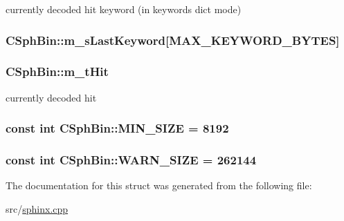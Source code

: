 currently decoded hit keyword (in keywords dict mode) 

\hypertarget{structCSphBin_ab3d45d1754daa2e7175ece1785856551}{
\subsubsection[{m\-\_\-s\-Last\-Keyword}]{ C\-Sph\-Bin\-::m\-\_\-s\-Last\-Keyword\mbox{[}{\bf M\-A\-X\-\_\-\-K\-E\-Y\-W\-O\-R\-D\-\_\-\-B\-Y\-T\-E\-S}\mbox{]}\hspace{0.3cm}{\ttfamily [protected]}}}\label{structCSphBin_ab3d45d1754daa2e7175ece1785856551}
\hypertarget{structCSphBin_a94ae6f84db17c75dde3391de09696026}{
\subsubsection[{m\-\_\-t\-Hit}]{ C\-Sph\-Bin\-::m\-\_\-t\-Hit\hspace{0.3cm}{\ttfamily [protected]}}}\label{structCSphBin_a94ae6f84db17c75dde3391de09696026}


currently decoded hit 

\hypertarget{structCSphBin_ae7e93ba8f3286a49b1c9c2e18cd53b8b}{
\subsubsection[{M\-I\-N\-\_\-\-S\-I\-Z\-E}]{\setlength{\rightskip}{0pt plus 5cm}const {\bf int} C\-Sph\-Bin\-::\-M\-I\-N\-\_\-\-S\-I\-Z\-E = 8192\hspace{0.3cm}{\ttfamily [static]}}}\label{structCSphBin_ae7e93ba8f3286a49b1c9c2e18cd53b8b}
\hypertarget{structCSphBin_ae687edd7f3d0ce8cfe4090134d4517a9}{
\subsubsection[{W\-A\-R\-N\-\_\-\-S\-I\-Z\-E}]{\setlength{\rightskip}{0pt plus 5cm}const {\bf int} C\-Sph\-Bin\-::\-W\-A\-R\-N\-\_\-\-S\-I\-Z\-E = 262144\hspace{0.3cm}{\ttfamily [static]}}}\label{structCSphBin_ae687edd7f3d0ce8cfe4090134d4517a9}


The documentation for this struct was generated from the following file\-:\begin{DoxyCompactItemize}
\item 
src/\hyperlink{sphinx_8cpp}{sphinx.\-cpp}\end{DoxyCompactItemize}
